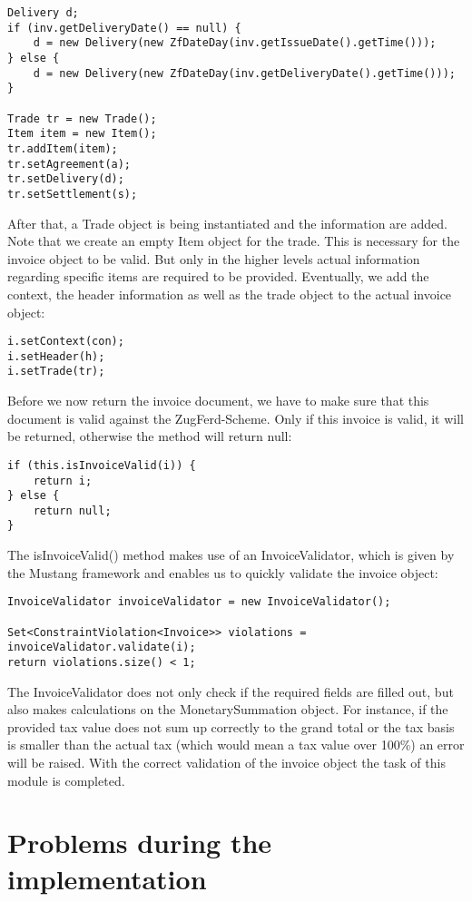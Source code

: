\begin{lstlisting}
Delivery d;
if (inv.getDeliveryDate() == null) {
    d = new Delivery(new ZfDateDay(inv.getIssueDate().getTime()));
} else {
    d = new Delivery(new ZfDateDay(inv.getDeliveryDate().getTime()));
}

Trade tr = new Trade();
Item item = new Item();
tr.addItem(item);
tr.setAgreement(a);
tr.setDelivery(d);
tr.setSettlement(s);
\end{lstlisting}

After that, a Trade object is being instantiated and the information are added. Note that we create an empty Item object for the trade. This is necessary for the invoice object to be valid. But only in the higher levels actual information regarding specific items are required to be provided.
Eventually, we add the context, the header information as well as the trade object to the actual invoice object:

\begin{lstlisting}
i.setContext(con);
i.setHeader(h);
i.setTrade(tr);
\end{lstlisting}

Before we now return the invoice document, we have to make sure that this document is valid against the ZugFerd-Scheme. Only if this invoice is valid, it will be returned, otherwise the method will return null:

\begin{lstlisting}
if (this.isInvoiceValid(i)) {
    return i;
} else {
    return null;
}
\end{lstlisting}

The isInvoiceValid() method makes use of an InvoiceValidator, which is given by the Mustang framework and enables us to quickly validate the invoice object:

\begin{lstlisting}
InvoiceValidator invoiceValidator = new InvoiceValidator();

Set<ConstraintViolation<Invoice>> violations = invoiceValidator.validate(i);
return violations.size() < 1;
\end{lstlisting}

The InvoiceValidator does not only check if the required fields are filled out, but also makes calculations on the MonetarySummation object. For instance, if the provided tax value does not sum up correctly to the grand total or the tax basis is smaller than the actual tax (which would mean a tax value over 100\%) an error will be raised.
With the correct validation of the invoice object the task of this module is completed. 

\section{Problems during the implementation}